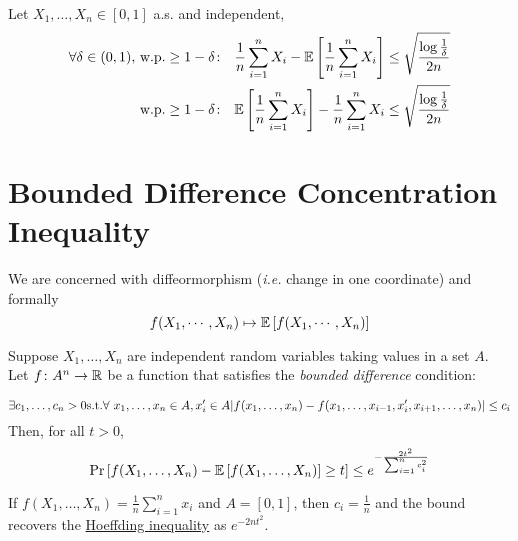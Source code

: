 \begin{remark}

    
    Let \(X_1, \ldots, X_n \in [0, 1]\) a.s. and independent, 
    \begin{align*}
        \forall \delta \in (0, 1), \ & \text{w.p.} \geq 1 - \delta \colon \ \ \frac{1}{n} 
        \sum_{i=1}^n X_i - \mathbb{E} \left[ \frac{1}{n}\sum_{i=1}^n X_i \right] \leq \sqrt{\frac{\log \frac{1}{\delta}}{2n}} \\ 
        &\text{w.p.} \geq 1 - \delta \colon \ \ \mathbb{E} \left[ \frac{1}{n}\sum_{i=1}^n X_i \right] - \frac{1}{n} 
        \sum_{i=1}^n X_i \leq \sqrt{\frac{\log \frac{1}{\delta}}{2n}}
    \end{align*}
\end{remark}

\section{Bounded Difference Concentration Inequality}

We are concerned with diffeormorphism (\emph{i.e.} change in one coordinate) and formally 
\[
    f(X_1, \cdots, X_n) \mapsto \mathbb{E} \left[ f(X_1, \cdots, X_n) \right]
\]


\begin{theorem} \label{def:mcd_ineq}
    Suppose \(X_1, \ldots, X_n\) are independent random variables taking values in a set \(A\). 
    Let \(f \colon A^n \to \mathbb{R}\) be a function that satisfies the \emph{bounded difference} condition:

    \[
      \exists c_1, \ldots, c_n > 0 \text{s.t.} \forall \ x_1, \ldots, x_n \in A, x_i' \in A \\ 
      \lvert f(x_1, \ldots, x_n) - f(x_1, \ldots, x_{i-1}, x_i', x_{i+1}, \ldots, x_n) \rvert \leq c_i  
    \]
    Then, for all \(t > 0\),
    \[
        \Pr \left[ f(X_1, \ldots, X_n) - \mathbb{E} \left[ f(X_1, \ldots, X_n) \right] \geq t \right]
        \leq e^{- \frac{2t^2}{\sum_{i=1}^n c_i^2}}
    \]
\end{theorem}

\begin{remark}
    If \(f(X_1, \ldots, X_n) = \frac{1}{n}\sum_{i=1}^n x_i\) and \(A = [0, 1]\), then 
    \(c_i = \frac{1}{n}\) and the bound recovers the \hyperref[def:hoeffding_ineq]{Hoeffding inequality} 
    as \(e^{-2nt^2}\). 
\end{remark}